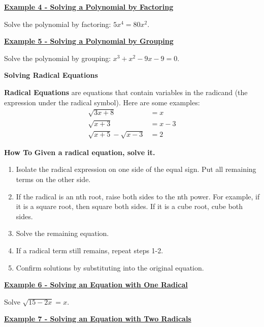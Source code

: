 \documentclass[12pt]{book}
\begin{document}
\underline{\textbf{Example 4 - Solving a Polynomial by Factoring}}

Solve the polynomial by factoring: $5x^4 = 80x^2$.
\vspace{35mm}


\underline{\textbf{Example 5 - Solving a Polynomial by Grouping}}

Solve the polynomial by grouping: $x^3+x^2-9x-9=0$.
\vspace{35mm}


{\large \textbf{Solving Radical Equations}}

\textbf{Radical Equations} are equations that contain variables in the radicand (the expression under the radical symbol). Here are some examples: 
\begin{align*}
    \sqrt{3x+8} &= x \\
    \sqrt{x+3} &= x-3 \\
    \sqrt{x+5} - \sqrt{x-3} &= 2 
\end{align*}

\newpage

\begin{boxR}
    \textbf{How To}
    \vspace{1mm}
    \hline
    \vspace{2mm}
    \textbf{Given a radical equation, solve it.}
    \begin{enumerate}
        \item Isolate the radical expression on one side of the equal sign. Put all remaining terms on the other side. 
        \item If the radical is an nth root, raise both sides to the nth power. For example, if it is a square root, then square both sides. If it is a cube root, cube both sides.
        \item Solve the remaining equation. 
        \item If a radical term still remains, repeat steps 1-2.
        \item Confirm solutions by substituting into the original equation.
    \end{enumerate}
\end{boxR}

\underline{\textbf{Example 6 - Solving an Equation with One Radical}}
\vspace{1mm}

Solve $\sqrt{15-2x}=x$.

\vspace{40mm}


\underline{\textbf{Example 7 - Solving an Equation with Two Radicals}}
\vspace{1mm}
\end{document}
